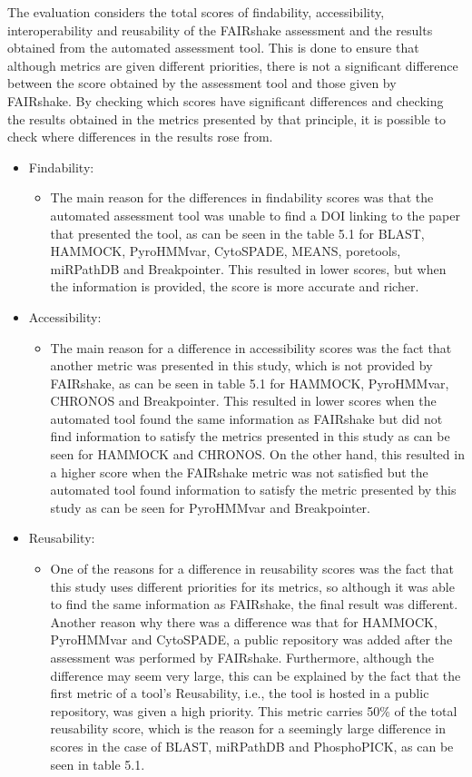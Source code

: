 \documentclass{cisfyp}
\begin{document}
The evaluation considers the total scores of findability, accessibility, interoperability and reusability of the FAIRshake assessment and the results obtained from the automated assessment tool. This is done to ensure that although metrics are given different priorities, there is not a significant difference between the score obtained by the assessment tool and those given by FAIRshake. By checking which scores have significant differences and checking the results obtained in the metrics presented by that principle, it is possible to check where differences in the results rose from.
\begin{itemize}
	\item Findability:
		\begin{itemize}
			\item The main reason for the differences in findability scores was that the automated assessment tool was unable to find a DOI linking to the paper that presented the tool, as can be seen in the table 5.1 for BLAST, HAMMOCK, PyroHMMvar, CytoSPADE, MEANS, poretools, miRPathDB and Breakpointer. This resulted in lower scores, but when the information is provided, the score is more accurate and richer.
		\end{itemize}
	\item Accessibility:
		\begin{itemize}
			\item The main reason for a difference in accessibility scores was the fact that another metric was presented in this study, which is not provided by FAIRshake, as can be seen in table 5.1 for HAMMOCK, PyroHMMvar, CHRONOS and Breakpointer. This resulted in lower scores when the automated tool found the same information as FAIRshake but did not find information to satisfy the metrics presented in this study as can be seen for HAMMOCK and CHRONOS. On the other hand, this resulted in a higher score when the FAIRshake metric was not satisfied but the automated tool found information to satisfy the metric presented by this study as can be seen for PyroHMMvar and Breakpointer.
		\end{itemize}
	\item Reusability:
		\begin{itemize}
			\item One of the reasons for a difference in reusability scores was the fact that this study uses different priorities for its metrics, so although it was able to find the same information as FAIRshake, the final result was different. Another reason why there was a difference was that for HAMMOCK, PyroHMMvar and CytoSPADE, a public repository was added after the assessment was performed by FAIRshake. Furthermore, although the difference may seem very large, this can be explained by the fact that the first metric of a tool's Reusability, i.e., the tool is hosted in a public repository, was given a high priority. This metric carries 50\% of the total reusability score, which is the reason for a seemingly large difference in scores in the case of BLAST, miRPathDB and PhosphoPICK, as can be seen in table 5.1.
		\end{itemize}
\end{itemize}
\end{document}
